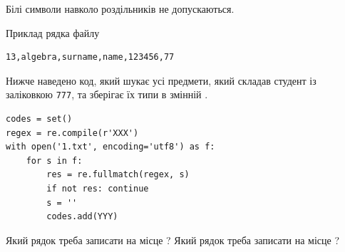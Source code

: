 \documentclass[12pt, ukrainian]{article}
\def\code#1{\Verb!#1!}
\begin{document}
{Білі символи навколо роздільників не допускаються.

Приклад рядка файлу



\begin{verbatim}
13,algebra,surname,name,123456,77
\end{verbatim}


Нижче наведено код, який шукає усі предмети, який складав студент із заліковкою \code{777}, та зберігає їх типи в змінній .



\begin{verbatim}
codes = set()
regex = re.compile(r'XXX')
with open('1.txt', encoding='utf8') as f:
    for s in f:
        res = re.fullmatch(regex, s)
        if not res: continue
        s = ''
        codes.add(YYY)
\end{verbatim}



Який рядок треба записати на місце  ?
Який рядок треба записати на місце  ?\par

}
\newpage
\end{document}
